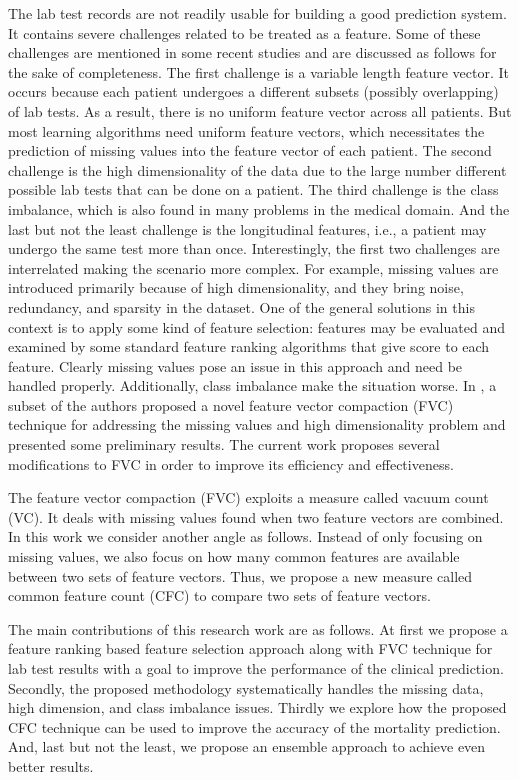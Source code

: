 The lab test records are not readily usable for building a good prediction system. It contains severe challenges related to be treated as a feature. Some of these challenges are mentioned in some recent studies \cite{mehedy-masud:2017:fvc, mehedy-masud:2018:frmwrk} and are discussed as follows for the sake of completeness. The first challenge is a variable length feature vector. It occurs because each patient undergoes a different subsets (possibly overlapping) of lab tests. As a result, there is no uniform feature vector across all patients. But most learning algorithms need uniform feature vectors, which necessitates the prediction of missing values into the feature vector of each patient. The second challenge is the high dimensionality of the data due to the large number different possible lab tests that can be done on a patient. The third challenge is the class imbalance, which is also found in many problems in the medical domain. And the last but not the least challenge is the longitudinal features, i.e., a patient may undergo the same test more than once. Interestingly, the first two challenges are interrelated making the scenario more complex. For example, missing values are introduced primarily because of high dimensionality, and they bring noise, redundancy, and sparsity in the dataset. One of the general solutions in this context is to apply some kind of feature selection: features may be evaluated and examined by some standard feature ranking algorithms that give score to each feature. Clearly missing values pose an issue in this approach and need be handled properly. Additionally, class imbalance make the situation worse. In \cite{mehedy-masud:2017:fvc, mehedy-masud:2018:frmwrk}, a subset of the authors proposed a novel feature vector compaction (FVC) technique for addressing the missing values and high dimensionality problem and presented some preliminary results. The current work proposes several modifications to FVC in order to improve its efficiency and effectiveness.

The feature vector compaction (FVC) exploits a measure called vacuum count (VC). It deals with missing values found when two feature vectors are combined. In this work we consider another angle as follows. Instead of only focusing on missing values, we also focus on how many common features are available between two sets of feature vectors. Thus, we propose a new measure called common feature count (CFC) to compare two sets of feature vectors.

The main contributions of this research work are as follows. At first we propose a feature ranking based feature selection approach along with FVC technique for lab test results with a goal to improve the performance of the clinical prediction. Secondly, the proposed methodology systematically handles the missing data, high dimension, and class imbalance issues. Thirdly we explore how the proposed CFC technique can be used to improve the accuracy of the mortality prediction. And, last but not the least, we propose an ensemble approach to achieve even better results.

